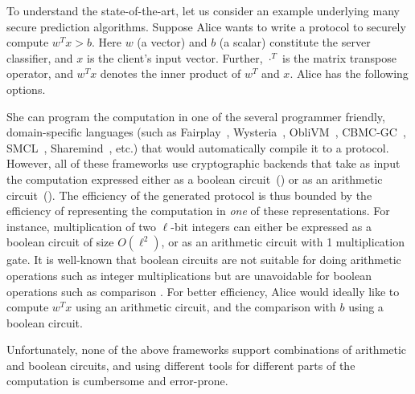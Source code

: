 To understand the
state-of-the-art, let us consider an example underlying many
secure prediction algorithms. Suppose Alice wants to write
a \mpc protocol to securely
compute $w^Tx >b$. Here $w$ (a vector) and $b$ (a scalar) constitute
the server classifier, and $x$ is the client's input vector. Further,
$\cdot^{T}$ is the matrix transpose operator, and $w^Tx$ denotes the
inner product of  $w^T$ and $x$. Alice has the following options.


She can program the computation in one of the several programmer
friendly, domain-specific languages (such
as Fairplay~\cite{fairplay}, Wysteria~\cite{wysteria},
ObliVM~\cite{oblivm}, CBMC-GC~\cite{cbmcgc}, SMCL~\cite{smcl},
Sharemind~\cite{sharemind}, \cite{lambdaps} etc.) that would
automatically compile it to a \mpc protocol. However, all of these
frameworks use cryptographic backends that take as input
the computation expressed either as a boolean
circuit~(\cite{yao,gmw}) or as an arithmetic circuit~(\cite{sss,viff,gentry}). 
%
The efficiency of the generated \mpc protocol is thus bounded by the
efficiency of representing the computation in \emph{one} of
these representations. For instance, multiplication of two
$\ell$-bit integers can either be expressed as a boolean circuit of
size $O(\ell^2)$, or as an arithmetic circuit with 1 multiplication
gate.
It is well-known that boolean circuits are not suitable for doing arithmetic operations such as integer multiplications but are unavoidable for boolean operations such as comparison \cite{aby,tasty,autoS,secureml,minionn,chameleon}.
%
For better efficiency, Alice would ideally like to compute
$w^Tx$ using an arithmetic circuit, and the comparison with $b$ using
a boolean circuit.
%

Unfortunately, none of the above frameworks support combinations of
arithmetic and boolean circuits, and using different tools for
different parts of the computation is cumbersome and error-prone.


